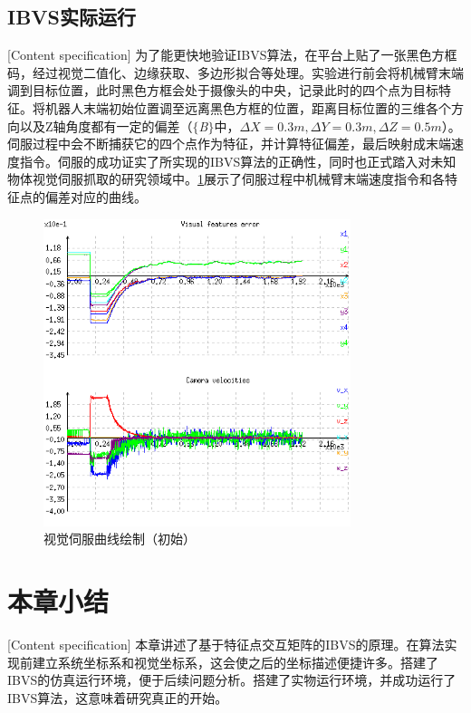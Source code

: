 \documentclass[fontset=fandol,type=bachelor,campus=harbin]{hithesisbook}
\begin{document}
\subsection{IBVS实际运行}[Content specification]
为了能更快地验证IBVS算法，在平台上贴了一张黑色方框码，经过视觉二值化、边缘获取、多边形拟合等处理。实验进行前会将机械臂末端调到目标位置，此时黑色方框会处于摄像头的中央，记录此时的四个点为目标特征。将机器人末端初始位置调至远离黑色方框的位置，距离目标位置的三维各个方向以及Z轴角度都有一定的偏差（$\lbrace$\textit{B}$\rbrace$中，$\varDelta X=0.3m,\varDelta Y=0.3m,\varDelta Z=0.5m$）。伺服过程中会不断捕获它的四个点作为特征，并计算特征偏差，最后映射成末端速度指令。伺服的成功证实了所实现的IBVS算法的正确性，同时也正式踏入对未知物体视觉伺服抓取的研究领域中。\ref{视觉伺服曲线绘制（初始）}展示了伺服过程中机械臂末端速度指令和各特征点的偏差对应的曲线。
\begin{figure}[h]
\centering
\includegraphics[width = 0.8\textwidth]{chapter2/视觉伺服曲线绘制（初始）}
\caption{视觉伺服曲线绘制（初始）}
\label{视觉伺服曲线绘制（初始）}
\end{figure}
\newpage
\section{本章小结}[Content specification]
本章讲述了基于特征点交互矩阵的IBVS的原理。在算法实现前建立系统坐标系和视觉坐标系，这会使之后的坐标描述便捷许多。搭建了IBVS的仿真运行环境，便于后续问题分析。搭建了实物运行环境，并成功运行了IBVS算法，这意味着研究真正的开始。
\end{document}
